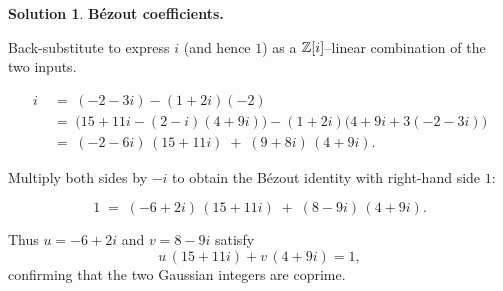\documentclass[12pt]{article}
\theoremstyle{definition} %
\newtheorem{solution}{Solution}
\theoremstyle{plain} %
\begin{document}
\begin{solution}
                      \bigskip
                      \textbf{Bézout coefficients.}
                      
                      Back-substitute to express $i$ (and hence $1$) as a $\Bbb Z[i]$–linear
                      combination of the two inputs.
                      
                      \[
                      \begin{aligned}
                      i
                        &\;=\;(-2-3i) - (1+2i)(-2)\\[4pt]
                        &\;=\; \bigl(15+11i-(2-i)(4+9i)\bigr) - (1+2i)\bigl(4+9i+3(-2-3i)\bigr)\\[4pt]
                        &\;=\;(-2-6i)\,(15+11i) \;+\; (9+8i)\,(4+9i).
                      \end{aligned}
                      \]
                      
                      Multiply both sides by $-i$ to obtain the Bézout identity with right-hand
                      side $1$:
                      
                      \[
                      \boxed{\;
                      1 \;=\;(-6+2i)\,(15+11i) \;+\; (8-9i)\,(4+9i).
                      \;}
                      \]
                      
                      Thus $u=-6+2i$ and $v=8-9i$ satisfy
                      \[
                      u\,(15+11i) + v\,(4+9i)=1,
                      \]
                      confirming that the two Gaussian integers are coprime.
                      \end{solution}
\end{document}
